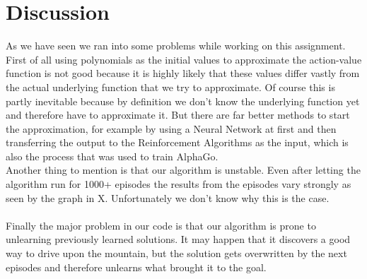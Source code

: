 \documentclass{article}
\begin{document}
	\section{Discussion}
	As we have seen we ran into some problems while working on this assignment. First of all using polynomials as the initial values to approximate the action-value function is not good because it is highly likely that these values differ vastly from the actual underlying function that we try to approximate. Of course this is partly inevitable because by definition we don't know the underlying function yet and therefore have to approximate it. But there are far better methods to start the approximation, for example by using a Neural Network at first and then transferring the output to the Reinforcement Algorithms as the input, which is also the process that was used to train AlphaGo. 
	\\
	Another thing to mention is that our algorithm is unstable. Even after letting the algorithm run for 1000+ episodes the results from the episodes vary strongly as seen by the graph in X. Unfortunately we don't know why this is the case. \\
	\\
	Finally the major problem in our code is that our algorithm is prone to unlearning previously learned solutions. It may happen that it discovers a good way to drive upon the mountain, but the solution gets overwritten by the next episodes and therefore unlearns what brought it to the goal. 
	
	
	
	
	
	
\end{document}
